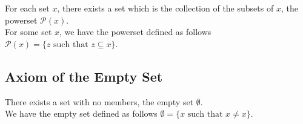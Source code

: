For each set $x$, there exists a set which is the collection of the
subsets of $x$, the powerset $\mathcal{P}(x)$.
\\[\baselineskip]
For some set $x$, we have the powerset defined as follows 
$\mathcal{P}(x) = \{z \text{ such that } z \subseteq x\}$.

\subsection{Axiom of the Empty Set}

There exists a set with no members, the empty set $\emptyset$.
\\[\baselineskip]
We have the empty set defined as follows 
$\emptyset = \{x \text{ such that } x \neq x\}$.
